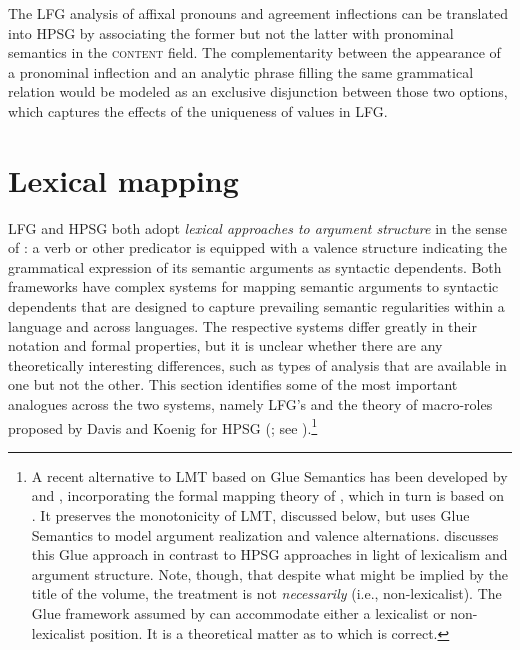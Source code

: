 The LFG analysis of  affixal pronouns and agreement inflections can be translated into HPSG by associating the former but not the latter with pronominal semantics in the \textsc{content} field.  
The complementarity between the appearance of a pronominal inflection and an analytic phrase filling the same grammatical relation would be modeled as an exclusive disjunction between those two options, which captures the effects of the uniqueness of  values in LFG.  
                  
                  
\section{Lexical mapping}
LFG and HPSG both adopt \textit{lexical approaches to argument structure} in the sense of \citet{MWArgSt}: a verb or other predicator is equipped with a valence structure indicating the grammatical expression of its semantic arguments as syntactic dependents.  Both frameworks have complex systems for mapping semantic arguments to syntactic dependents that are designed to capture prevailing semantic regularities within a language and across languages.   The respective systems differ greatly in their notation and formal properties, but it is unclear whether 
there are any theoretically interesting differences, such as types of analysis that are available in one but not the other.  This section identifies some of the most important  analogues across the two systems, namely LFG's  \citep[LMT;][Chapter 14]{BATW2016a} and the theory of macro-roles proposed by Davis and Koenig for HPSG (\citealt{Davis96a-u,DK2000b-u}; see ).\footnote{A recent alternative to LMT based on Glue Semantics has been developed by \citet{asudeh;giorgolo-lfg12} and \citet{asudeh;ea14-lfg}, incorporating the formal mapping theory of \citet{findlay16}, which in turn is based on \citet{kibort07}. It preserves the monotonicity of LMT, discussed below, but uses Glue Semantics to model argument realization and valence alternations. \citet{MuellerLFGphrasal} discusses this Glue approach in contrast to HPSG approaches in light of lexicalism and argument structure. Note, though, that despite what might be implied by the title of the \citeauthor{MuellerLFGphrasal} volume, the \citeauthor{asudeh;ea14-lfg} treatment is not \emph{necessarily}  (i.e., non-lexicalist). The  Glue framework assumed by \citeauthor{asudeh;ea14-lfg} can accommodate either a lexicalist or non-lexicalist position. It is a theoretical matter as to which is correct.}
 
